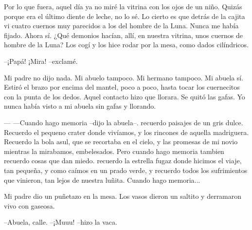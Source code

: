 \documentclass[a3paper]{tufte-handout}
\begin{document}
Por lo que fuera, aquel día ya no miré la vitrina con los ojos de un niño. Quizás porque era el último diente de leche, no lo sé. Lo cierto es que detrás de la cajita vi cuatro cuernos muy parecidos a los del hombre de la Luna. Nunca me había fijado. Ahora sí. ¿Qué demonios hacían, allí, en nuestra vitrina, unos cuernos de hombre de la Luna? Los cogí y los hice rodar por la mesa, como dados cilíndricos.

{\tiny
--¡Papá! ¡Mira! --exclamé.}

Mi padre no dijo nada. Mi abuelo tampoco. Mi hermano tampoco. Mi abuela sí. Estiró el brazo por encima del mantel, poco a poco, hasta tocar los cuernecitos con la punta de los dedos. Aquel contacto hizo que llorara. Se quitó las gafas. Yo nunca había visto a mi abuela sin gafas y llorando.

--- ---Cuando hago memoria --dijo la abuela--. recuerdo paisajes de un gris dulce. Recuerdo el pequeno crater donde vivíamos, y los rincones de aquella madriguera. Recuerdo la bola asul, que se recortaba en el cielo, y las promesas de mi novio mientras la mirabamos, embelesados. Pero cuando hago memoria tambien recuerdo cosas que dan miedo. recuerdo la estrella fugaz donde hicimos el viaje, tan pequeña, y como caímos en un prado verde, y recuerdo todos los sufrimientos que vinieron, tan lejos de nuestra luñita. Cuando hago memoria...

Mi padre dio un puñetazo en la mesa. Los vasos dieron un saltito y derramaron vivo con gaseosa.
\begin{center}
	{\Huge 
	--Abuela, calle.
	--¡Muuu! --hizo la vaca.
    }
\end{center} 




\citep{Albert}
\citep{Ruben}


\end{document}
